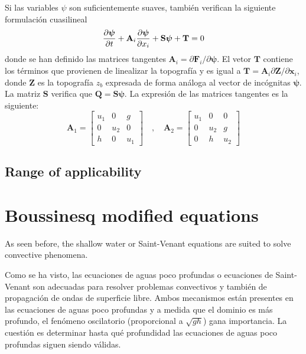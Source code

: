 Si las variables $\psi$ son suficientemente suaves, también verifican la siguiente formulación cuasilineal
\begin{equation}
    \frac{\partial\bm\psi}{\partial t} + \mathbf{A}_i\frac{\partial\bm\psi}{\partial x_i} + \mathbf{S}\bm{\psi} + \mathbf{T} = 0
\end{equation}
donde se han definido las matrices tangentes $\mathbf{A}_i = \partial\mathbf{F}_i/\partial\bm{\psi}$. El vetor $\mathbf{T}$ contiene los términos que provienen de linealizar la topografía y es igual a $\mathbf{T} = \mathbf{A}_i\partial\mathbf{Z}/\partial\mathbf{x}_i$, donde $\mathbf{Z}$ es la topografía $z_b$ expresada de forma análoga al vector de incógnitas $\bm\psi$. La matriz $\mathbf{S}$ verifica que $\mathbf{Q} = \mathbf{S}\bm{\psi}$. La expresión de las matrices tangentes es la siguiente:
\begin{equation}
    \mathbf{A}_1 = \left[\begin{array}{ccc}
        u_1 &  0  &  g  \\
         0  & u_2 &  0  \\
         h  &  0  & u_1
    \end{array}\right] \quad , \quad
    \mathbf{A}_2 = \left[\begin{array}{ccc}
        u_1 &  0  &  0  \\
         0  & u_2 &  g  \\
         0  &  h  & u_2
    \end{array}\right]
\end{equation}


\subsection{Range of applicability}






\section{Boussinesq modified equations}


As seen before, the shallow water or Saint-Venant equations are suited to solve convective phenomena.

Como se ha visto, las ecuaciones de aguas poco profundas o ecuaciones de Saint-Venant son adecuadas para resolver problemas convectivos y también de propagación de ondas de superficie libre. Ambos mecanismos están presentes en las ecuaciones de aguas poco profundas y a medida que el dominio es más profundo, el fenómeno oscilatorio (proporcional a $\sqrt{gh}$) gana importancia. La cuestión es determinar hasta qué profundidad las ecuaciones de aguas poco profundas siguen siendo válidas.

